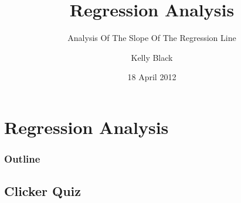 
\section{Regression Analysis}

\title{Regression Analysis}
\subtitle{Analysis Of The Slope Of The Regression Line}

\author{Kelly Black}
\date{18 April 2012}

\begin{frame}
  \titlepage
\end{frame}

\begin{frame}
  \frametitle{Outline}
  \tableofcontents[pausesection,hideothersubsections,sectionstyle=show/hide]
\end{frame}


\subsection{Clicker Quiz}


